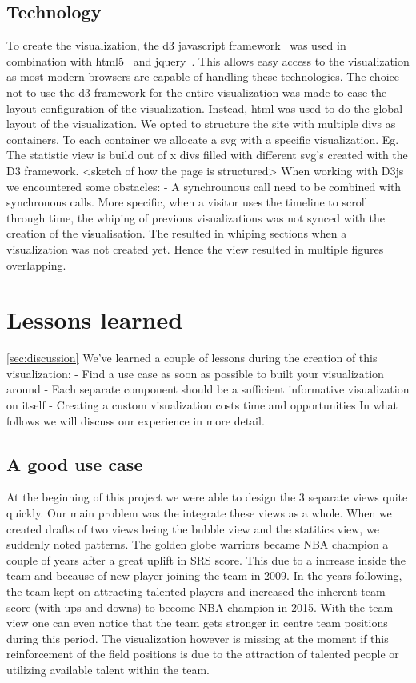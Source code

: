 \documentclass{sigchi}
\begin{document}
\subsection{Technology}
To create the visualization, the d3 javascript framework~\cite{d3} was used in
combination with html5~\cite{html5} and jquery~\cite{jquery}. This allows easy
access to the visualization as most modern browsers are capable of handling
these technologies.
The choice not to use the d3 framework for the entire visualization was made to
ease the layout configuration of the visualization. Instead, html was used to do
the global layout of the visualization. We opted to structure the site with multiple
divs as containers. To each container we allocate a svg with a specific visualization.
Eg. The statistic view is build out of x divs filled with different svg's created
with the D3 framework.
<sketch of how the page is structured>
When working with D3js we encountered some obstacles:
- A synchrounous call need to be combined with synchronous calls. More specific, when a
visitor uses the timeline to scroll through time, the whiping of previous visualizations 
was not synced with the creation of the visualisation. The resulted in whiping sections 
when a visualization was not created yet. Hence the view resulted in multiple figures 
overlapping.


\section{Lessons learned}\ref{sec:discussion}
We've learned a couple of lessons during the creation of this visualization:
- Find a use case as soon as possible to built your visualization around
- Each separate component should be a sufficient informative visualization on itself
- Creating a custom visualization costs time and opportunities
In what follows we will discuss our experience in more detail.

\subsection{A good use case}
At the beginning of this project we were able to design the 3 separate views 
quite quickly. Our main problem was the integrate these views as a whole. When we created drafts
of two views being the bubble view and the statitics view, we suddenly noted patterns. The golden
globe warriors became NBA champion a couple of years after a great uplift in SRS score. This 
due to a increase inside the team and because of new player joining the team in 2009. In 
the years following, the team kept on attracting talented players and increased the inherent
team score (with ups and downs) to become NBA champion in 2015. With the team view one can even
notice that the team gets stronger in centre team positions during this period.
The visualization however is missing at the moment if this reinforcement of the field positions
is due to the attraction of talented people or utilizing available talent within the team.
\end{document}
